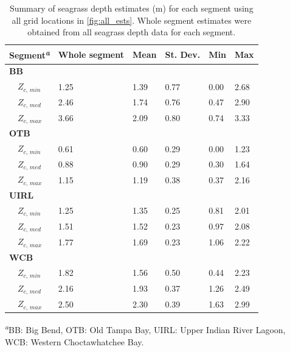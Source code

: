 \documentclass[letterpaper,12pt,oneside]{article}\usepackage[]{graphicx}\usepackage[]{color}
\begin{document}
\begin{table}[!tbp]
\caption{Summary of seagrass depth estimates (m) for each segment using all grid locations in \cref{fig:all_ests}.  Whole segment estimates were obtained from all seagrass depth data for each segment.\label{tab:est_summ}} 
\begin{center}
\begin{tabular}{llllll}
\hline\hline
\multicolumn{1}{l}{{\bf Segment\textsuperscript{\textit{a}}}}&\multicolumn{1}{c}{Whole segment}&\multicolumn{1}{c}{Mean}&\multicolumn{1}{c}{St. Dev.}&\multicolumn{1}{c}{Min}&\multicolumn{1}{c}{Max}\tabularnewline
\hline
{\bfseries BB}&&&&&\tabularnewline
~~$Z_{c,\,min}$&1.25&1.39&0.77&0.00&2.68\tabularnewline
~~$Z_{c,\,med}$&2.46&1.74&0.76&0.47&2.90\tabularnewline
~~$Z_{c,\,max}$&3.66&2.09&0.80&0.74&3.33\tabularnewline
\hline
{\bfseries OTB}&&&&&\tabularnewline
~~$Z_{c,\,min}$&0.61&0.60&0.29&0.00&1.23\tabularnewline
~~$Z_{c,\,med}$&0.88&0.90&0.29&0.30&1.64\tabularnewline
~~$Z_{c,\,max}$&1.15&1.19&0.38&0.37&2.16\tabularnewline
\hline
{\bfseries UIRL}&&&&&\tabularnewline
~~$Z_{c,\,min}$&1.25&1.35&0.25&0.81&2.01\tabularnewline
~~$Z_{c,\,med}$&1.51&1.52&0.23&0.97&2.08\tabularnewline
~~$Z_{c,\,max}$&1.77&1.69&0.23&1.06&2.22\tabularnewline
\hline
{\bfseries WCB}&&&&&\tabularnewline
~~$Z_{c,\,min}$&1.82&1.56&0.50&0.44&2.23\tabularnewline
~~$Z_{c,\,med}$&2.16&1.93&0.37&1.26&2.49\tabularnewline
~~$Z_{c,\,max}$&2.50&2.30&0.39&1.63&2.99\tabularnewline
\hline
\end{tabular}\end{center}

\textsuperscript{\textit{a}}\footnotesize BB: Big Bend, OTB: Old Tampa Bay, UIRL: Upper Indian River Lagoon, WCB: Western Choctawhatchee Bay.\end{table}
\end{document}
